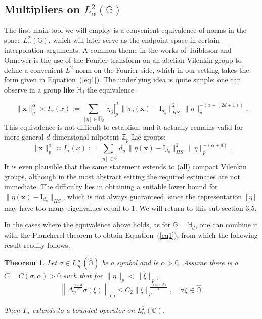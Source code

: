 \documentclass[12pt, reqno]{amsart}
\newtheorem{teo}[defi]{Theorem}
\newcommand{\Z}{\mathbb{Z}}
\newcommand{\1}{\mathds{1}}
\newcommand{\G}{\mathbb{G}}
\begin{document}
\subsection{Multipliers on $L^2_\alpha(\G)$}
The first main tool we will employ is a convenient equivalence of norms in the space 
$L^2_\alpha(\G)$, which will later serve as the endpoint space in certain interpolation arguments. 
A common theme in the works of Taibleson and Onnewer \cite{Taibleson1970, SaloffCoste1986} 
is the use of the Fourier transform on an abelian Vilenkin group to define a convenient $L^2$-norm 
on the Fourier side, which in our setting takes the form given in Equation~(\ref{eq1}). 
The underlying idea is quite simple: one can observe in a group like $\mathbb{H}_d$ the equivalence

\begin{equation}\label{EqEquivalenultrametric1}
    \|\mathbf{x}\|_{p}^\alpha \asymp I_\alpha(x) := 
    \sum_{[\eta] \in \widehat{\mathbb{H}}_d} 
    |\eta_3|_p^d \, \|\pi_\eta(\mathbf{x}) - \mathrm{I}_{ d_\eta} \|^2_{HS} \, 
    \|\eta\|_p^{-(\alpha+(2d+1))}.
\end{equation}This equivalence is not difficult to establish, and it actually remains valid 
for more general $d$-dimensional nilpotent $\Z_p$-Lie groups:
\[
    \|\mathbf{x}\|_{p}^\alpha \asymp I_\alpha(x) := 
    \sum_{[\eta] \in \widehat{\G}} 
    d_\eta \, \|\eta(\mathbf{x}) - \mathrm{I}_{ d_\eta} \|^2_{HS} \, 
    \|\eta\|_p^{-(\alpha+d)}.
\]
It is even plausible that the same statement extends to (all) compact Vilenkin groups, 
although in the most abstract setting the required estimates are not immediate. 
The difficulty lies in obtaining a suitable lower bound for 
$\|\eta(\mathbf{x}) - \mathrm{I}_{d_\eta} \|_{HS}$, which is not always guaranteed, 
since the representation $[\eta]$ may have too many eigenvalues equal to $1$. 
We will return to this sub-section 3.5.  

In the cases where the equivalence above holds, as for $\G = \mathbb{H}_d$, 
one can combine it with the Plancherel theorem to obtain Equation~(\ref{eq1}), 
from which the following result readily follows. 


\begin{teo}\label{teomultL2v1}
    Let $\sigma \in L^\infty_{op}(\widehat{\G})$ be a symbol and le $\alpha>0$. Assume there is a $C = C(\sigma,\alpha) > 0$ such that for $\|\eta\|_p < \|\xi\|_p$,
    \[
    \left\| \Delta_{\eta}^{\frac{\alpha + d}{2}} \sigma(\xi) \right\|_{\mathrm{op}} \leq C_2 \|\xi\|_p^\frac{-(\alpha + d)}{2}, \quad \forall \xi \in \widehat{\mathbb{G}}.
    \]

Then $T_\sigma$ extends to a bounded operator on $L^2_\alpha(\mathbb{G})$.
\end{teo}
\end{document}
